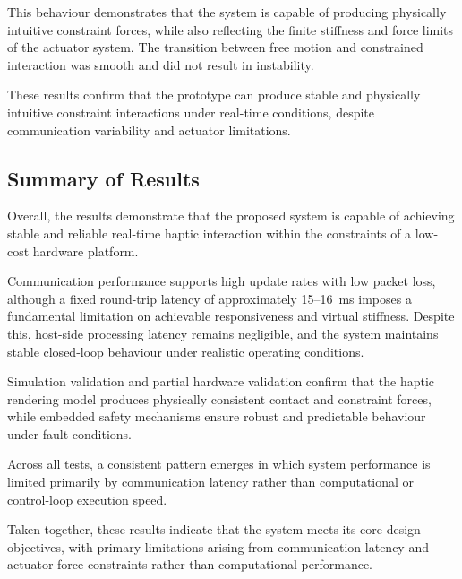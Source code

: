 This behaviour demonstrates that the system is capable of producing physically intuitive constraint forces, while also reflecting the finite stiffness and force limits of the actuator system. The transition between free motion and constrained interaction was smooth and did not result in instability.

These results confirm that the prototype can produce stable and physically intuitive constraint interactions under real-time conditions, despite communication variability and actuator limitations.

\subsection{Summary of Results}

Overall, the results demonstrate that the proposed system is capable of achieving stable and reliable real-time haptic interaction within the constraints of a low-cost hardware platform.

Communication performance supports high update rates with low packet loss, although a fixed round-trip latency of approximately 15--16~ms imposes a fundamental limitation on achievable responsiveness and virtual stiffness. Despite this, host-side processing latency remains negligible, and the system maintains stable closed-loop behaviour under realistic operating conditions.

Simulation validation and partial hardware validation confirm that the haptic rendering model produces physically consistent contact and constraint forces, while embedded safety mechanisms ensure robust and predictable behaviour under fault conditions.

Across all tests, a consistent pattern emerges in which system performance is limited primarily by communication latency rather than computational or control-loop execution speed.

Taken together, these results indicate that the system meets its core design objectives, with primary limitations arising from communication latency and actuator force constraints rather than computational performance.